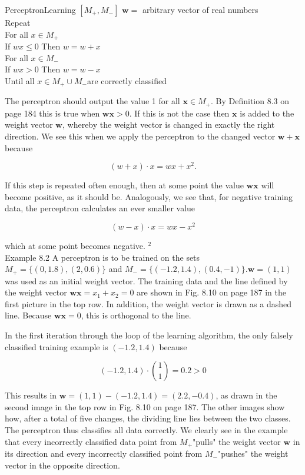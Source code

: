 \documentclass[10pt]{book}
\begin{document}
\begin{center}
\begin{enumerate}
\begin{center}
PerceptronLearning $\left[M_{+}, M_{-}\right]$ $\boldsymbol{w}=$ arbitrary vector of real numbers\\
Repeat\\
For all $x \in M_{+}$\\
If $w x \leq 0$ Then $w=w+x$\\
For all $x \in M_{-}$\\
If $w x>0$ Then $w=w-x$\\
Until all $x \in M_{+} \cup M_{-}$are correctly classified

The perceptron should output the value 1 for all $\boldsymbol{x} \in M_{+}$. By Definition 8.3 on page 184 this is true when $\boldsymbol{w} \boldsymbol{x}>0$. If this is not the case then $\boldsymbol{x}$ is added to the weight vector $\boldsymbol{w}$, whereby the weight vector is changed in exactly the right direction. We see this when we apply the perceptron to the changed vector $\boldsymbol{w}+\boldsymbol{x}$ because

$$
(w+x) \cdot x=w x+x^{2} .
$$

If this step is repeated often enough, then at some point the value $\boldsymbol{w} \boldsymbol{x}$ will become positive, as it should be. Analogously, we see that, for negative training data, the perceptron calculates an ever smaller value

$$
(w-x) \cdot x=w x-x^{2}
$$

which at some point becomes negative. ${ }^{2}$\\
Example 8.2 A perceptron is to be trained on the sets $M_{+}=\{(0,1.8),(2,0.6)\}$ and $M_{-}=\{(-1.2,1.4),(0.4,-1)\} . \boldsymbol{w}=(1,1)$ was used as an initial weight vector. The training data and the line defined by the weight vector $\boldsymbol{w} \boldsymbol{x}=x_{1}+x_{2}=0$ are shown in Fig. 8.10 on page 187 in the first picture in the top row. In addition, the weight vector is drawn as a dashed line. Because $\boldsymbol{w} \boldsymbol{x}=0$, this is orthogonal to the line.

In the first iteration through the loop of the learning algorithm, the only falsely classified training example is $(-1.2,1.4)$ because

$$
(-1.2,1.4) \cdot\binom{1}{1}=0.2>0
$$

This results in $\boldsymbol{w}=(1,1)-(-1.2,1.4)=(2.2,-0.4)$, as drawn in the second image in the top row in Fig. 8.10 on page 187. The other images show how, after a total of five changes, the dividing line lies between the two classes. The perceptron thus classifies all data correctly. We clearly see in the example that every incorrectly classified data point from $M_{+}$"pulls" the weight vector $\boldsymbol{w}$ in its direction and every incorrectly classified point from $M_{-}$"pushes" the weight vector in the opposite direction.


\end{center}
\end{enumerate}
\end{center}
\end{document}
